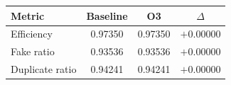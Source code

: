 \renewcommand{\arraystretch}{1.4}
\begin{tabular}{lccc}
\toprule
Metric & Baseline & O3 & $\Delta$ \\
\midrule
Efficiency & 0.97350 & 0.97350 & $+0.00000$ \\
\rowcolor{gray!15}
Fake ratio & 0.93536 & 0.93536 & $+0.00000$ \\
Duplicate ratio & 0.94241 & 0.94241 & $+0.00000$ \\
\bottomrule
\end{tabular}
